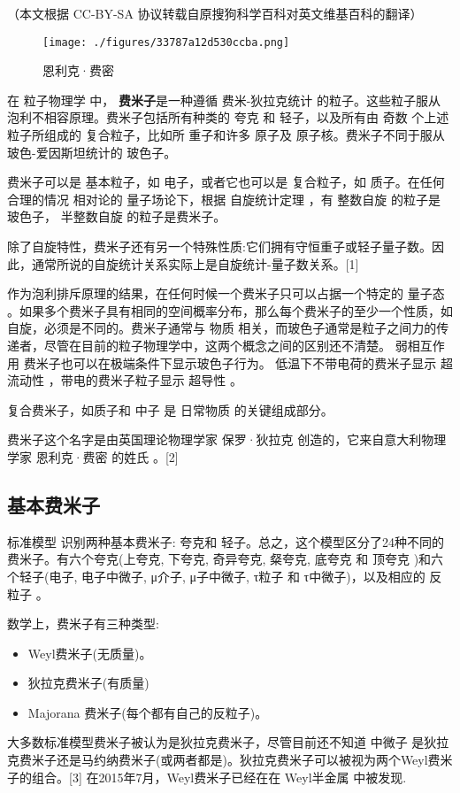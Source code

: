 
（本文根据 CC-BY-SA 协议转载自原搜狗科学百科对英文维基百科的翻译）

\begin{figure}[ht]
\centering
\texttt{[image: ./figures/33787a12d530ccba.png]}
\caption{恩利克·费密} \label{fig_Fermio_1}
\end{figure}

在 粒子物理学 中， \textbf{费米子}是一种遵循 费米-狄拉克统计 的粒子。这些粒子服从 泡利不相容原理。费米子包括所有种类的 夸克 和 轻子，以及所有由 奇数 个上述粒子所组成的 复合粒子，比如所 重子和许多 原子及 原子核。费米子不同于服从 玻色-爱因斯坦统计的 玻色子。

费米子可以是 基本粒子，如 电子，或者它也可以是 复合粒子，如 质子。在任何合理的情况 相对论的 量子场论下，根据 自旋统计定理 ，有 整数自旋 的粒子是 玻色子， 半整数自旋 的粒子是费米子。

除了自旋特性，费米子还有另一个特殊性质:它们拥有守恒重子或轻子量子数。因此，通常所说的自旋统计关系实际上是自旋统计-量子数关系。[1]

作为泡利排斥原理的结果，在任何时候一个费米子只可以占据一个特定的 量子态 。如果多个费米子具有相同的空间概率分布，那么每个费米子的至少一个性质，如自旋，必须是不同的。费米子通常与 物质 相关，而玻色子通常是粒子之间力的传递者，尽管在目前的粒子物理学中，这两个概念之间的区别还不清楚。 弱相互作用 费米子也可以在极端条件下显示玻色子行为。 低温下不带电荷的费米子显示 超流动性 ，带电的费米子粒子显示 超导性 。

复合费米子，如质子和 中子 是 日常物质 的关键组成部分。

费米子这个名字是由英国理论物理学家 保罗·狄拉克 创造的，它来自意大利物理学家 恩利克·费密 的姓氏 。[2]

\subsection{基本费米子}
标准模型 识别两种基本费米子: 夸克和 轻子。总之，这个模型区分了24种不同的费米子。有六个夸克(上夸克, 下夸克, 奇异夸克, 粲夸克, 底夸克 和 顶夸克 )和六个轻子(电子, 电子中微子, μ介子, μ子中微子, τ粒子 和 τ中微子)，以及相应的 反粒子 。

数学上，费米子有三种类型:
\begin{itemize}
\item Weyl费米子(无质量)。
\item 狄拉克费米子(有质量)
\item Majorana 费米子(每个都有自己的反粒子)。
\end{itemize}
大多数标准模型费米子被认为是狄拉克费米子，尽管目前还不知道 中微子 是狄拉克费米子还是马约纳费米子(或两者都是)。狄拉克费米子可以被视为两个Weyl费米子的组合。[3] 在2015年7月，Weyl费米子已经在在 Weyl半金属 中被发现.

